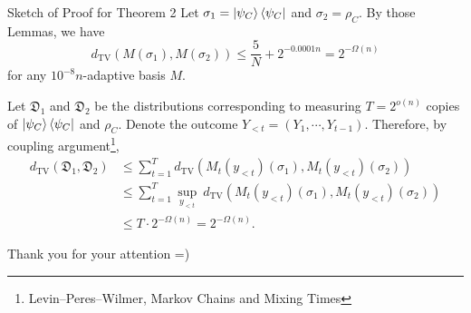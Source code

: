 \begin{frame}{Sketch of Proof for Theorem 2}
Let $\sigma_1=\ket{\psi_C}\bra{\psi_C}$ and $\sigma_2=\rho_C$.
By those Lemmas, we have
\[
	d_{\mathrm{TV}}\left(M(\sigma_1),M(\sigma_2)\right)\le\frac{5}{N}+2^{-0.0001n}=2^{-\Omega (n)}
\]
for any $10^{-8}n$-adaptive basis $M$.

Let $\mathfrak{D}_1$ and $\mathfrak{D}_2$ be the distributions corresponding to measuring $T=2^{o(n)}$ copies of $\ket{\psi_C}\bra{\psi_C}$ and $\rho_C$.
Denote the outcome $Y_{<t}=(Y_1,\cdots,Y_{t-1})$.
Therefore, by coupling argument\footnote{Levin--Peres--Wilmer, Markov Chains and Mixing Times},
\begin{align*}
d_{\mathrm{TV}}\left(\mathfrak{D}_1,\mathfrak{D}_2\right)&\le\sum_{t=1}^Td_{\mathrm{TV}}\left(M_t(y_{<t})(\sigma_1),M_t(y_{<t})(\sigma_2)\right)\\
&\le\sum_{t=1}^T\sup_{y_{<t}}\ d_{\mathrm{TV}}\left(M_t(y_{<t})(\sigma_1),M_t(y_{<t})(\sigma_2)\right)\\
&\le T\cdot2^{-\Omega(n)}=2^{-\Omega(n)}.
\end{align*}
\end{frame}

\begin{frame}
\centering\Large Thank you for your attention =)
\end{frame}